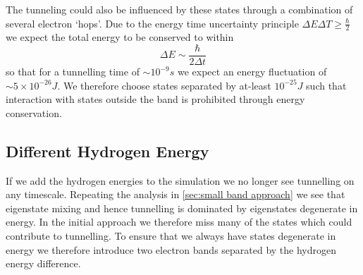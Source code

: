 The tunneling could also be
influenced by these states
through a combination of
several electron `hops'.
Due to the energy time uncertainty
principle \(\Delta{}E\Delta{}T \geq \frac{\hbar}{2}\)
we expect the total energy to be conserved
to within
\begin{equation}
    \Delta{}E \sim \frac{\hbar}{2\Delta{} t}
\end{equation}
so that for a tunnelling time of
\(\sim 10^{-9}s\)
we expect an energy fluctuation
of \(\sim 5\times{}10^{-26} J\).
We therefore choose states separated
by at-least \(10^{-25} J\) such that
interaction with states outside
the band is prohibited
through energy conservation.


\subsection{Different Hydrogen Energy}
If we add the hydrogen energies to the
simulation we no longer see tunnelling
on any timescale. Repeating the analysis
in \cref{sec:small band approach} we
see that eigenstate mixing and hence
tunnelling is dominated by
eigenstates degenerate in energy.
In the initial approach we therefore
miss many of the states which could
contribute to tunnelling. To ensure that we always have
states degenerate in energy we
therefore introduce two electron
bands separated by the hydrogen energy
difference.
